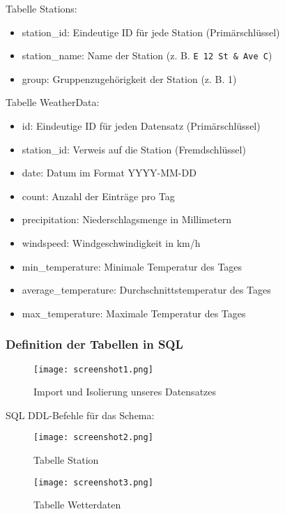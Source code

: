 \documentclass[a4paper,12pt]{article}
\begin{document}
Tabelle Stations:
\begin{itemize}
    \item station\_id: Eindeutige ID für jede Station (Primärschlüssel)
    \item station\_name: Name der Station (z. B. \texttt{E 12 St \& Ave C})
    \item group: Gruppenzugehörigkeit der Station (z. B. 1)
\end{itemize}

Tabelle WeatherData:
\begin{itemize}
    \item id: Eindeutige ID für jeden Datensatz (Primärschlüssel)
    \item station\_id: Verweis auf die Station (Fremdschlüssel)
    \item date: Datum im Format YYYY-MM-DD
    \item count: Anzahl der Einträge pro Tag
    \item precipitation: Niederschlagsmenge in Millimetern
    \item windspeed: Windgeschwindigkeit in km/h
    \item min\_temperature: Minimale Temperatur des Tages
    \item average\_temperature: Durchschnittstemperatur des Tages
    \item max\_temperature: Maximale Temperatur des Tages
\end{itemize}

\subsubsection{Definition der Tabellen in SQL}

\begin{figure}[H]
    \centering
    \texttt{[image: screenshot1.png]} 
    \caption{Import und Isolierung unseres Datensatzes} 
    \label{fig:screenshot1} 
\end{figure}

SQL DDL-Befehle für das Schema:
\begin{figure}[H]
    \centering
    \texttt{[image: screenshot2.png]} 
    \caption{Tabelle Station} 
    \label{fig:screenshot2} 
\end{figure}

\begin{figure}[H]
    \centering
    \texttt{[image: screenshot3.png]} 
    \caption{Tabelle Wetterdaten} 
    \label{fig:screenshot3} 
\end{figure}
\end{document}
